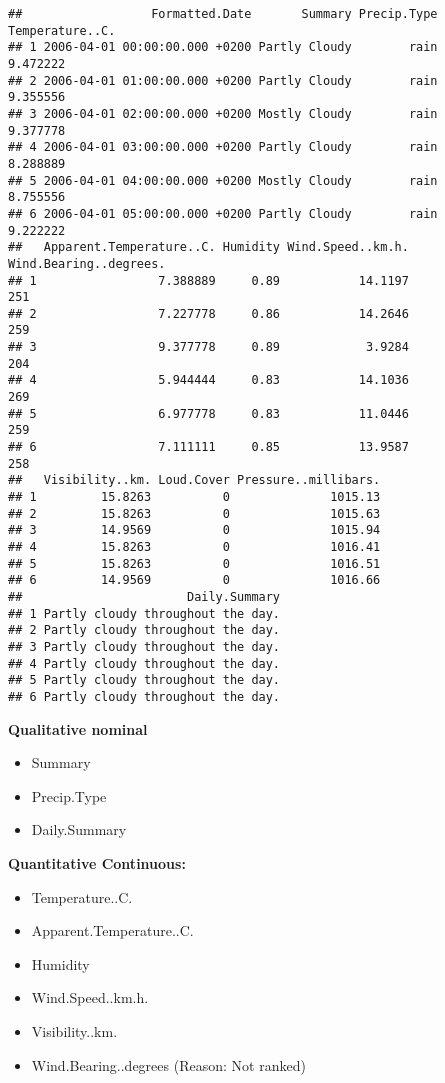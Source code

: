 \documentclass[
]{article}
\providecommand{\tightlist}{%
  \setlength{\itemsep}{0pt}\setlength{\parskip}{0pt}}
\begin{document}
\begin{verbatim}
##                  Formatted.Date       Summary Precip.Type Temperature..C.
## 1 2006-04-01 00:00:00.000 +0200 Partly Cloudy        rain        9.472222
## 2 2006-04-01 01:00:00.000 +0200 Partly Cloudy        rain        9.355556
## 3 2006-04-01 02:00:00.000 +0200 Mostly Cloudy        rain        9.377778
## 4 2006-04-01 03:00:00.000 +0200 Partly Cloudy        rain        8.288889
## 5 2006-04-01 04:00:00.000 +0200 Mostly Cloudy        rain        8.755556
## 6 2006-04-01 05:00:00.000 +0200 Partly Cloudy        rain        9.222222
##   Apparent.Temperature..C. Humidity Wind.Speed..km.h. Wind.Bearing..degrees.
## 1                 7.388889     0.89           14.1197                    251
## 2                 7.227778     0.86           14.2646                    259
## 3                 9.377778     0.89            3.9284                    204
## 4                 5.944444     0.83           14.1036                    269
## 5                 6.977778     0.83           11.0446                    259
## 6                 7.111111     0.85           13.9587                    258
##   Visibility..km. Loud.Cover Pressure..millibars.
## 1         15.8263          0              1015.13
## 2         15.8263          0              1015.63
## 3         14.9569          0              1015.94
## 4         15.8263          0              1016.41
## 5         15.8263          0              1016.51
## 6         14.9569          0              1016.66
##                       Daily.Summary
## 1 Partly cloudy throughout the day.
## 2 Partly cloudy throughout the day.
## 3 Partly cloudy throughout the day.
## 4 Partly cloudy throughout the day.
## 5 Partly cloudy throughout the day.
## 6 Partly cloudy throughout the day.
\end{verbatim}

\textbf{Qualitative nominal}

\begin{itemize}
\tightlist
\item
  Summary
\item
  Precip.Type
\item
  Daily.Summary
\end{itemize}

\textbf{Quantitative Continuous:}

\begin{itemize}
\tightlist
\item
  Temperature..C.
\item
  Apparent.Temperature..C.
\item
  Humidity
\item
  Wind.Speed..km.h.
\item
  Visibility..km.
\item
  Wind.Bearing..degrees (Reason: Not ranked)
\end{itemize}
\end{document}
